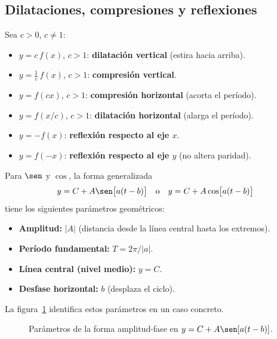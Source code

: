 \subsection{Dilataciones, compresiones y reflexiones}

Sea $c > 0$, $c \neq 1$:
\begin{itemize}
  \item $y = c\,f(x)$, $c>1$: \textbf{dilatación vertical} (estira hacia arriba).
  \item $y = \tfrac{1}{c}\,f(x)$, $c>1$: \textbf{compresión vertical}.
  \item $y = f(cx)$, $c>1$: \textbf{compresión horizontal} (acorta el período).
  \item $y = f(x/c)$, $c>1$: \textbf{dilatación horizontal} (alarga el período).
  \item $y = -f(x)$: \textbf{reflexión respecto al eje $x$}.
  \item $y = f(-x)$: \textbf{reflexión respecto al eje $y$} (no altera paridad).
\end{itemize}

Para $\sen$ y $\cos$, la forma generalizada
\[
  y = C + A\sen\bigl[a(t - b)\bigr] \quad \text{o} \quad y = C + A\cos\bigl[a(t - b)\bigr]
\]
tiene los siguientes parámetros geométricos:
\begin{itemize}
  \item \textbf{Amplitud:} $|A|$ (distancia desde la línea central hasta los extremos).
  \item \textbf{Período fundamental:} $T = 2\pi/|a|$.
  \item \textbf{Línea central (nivel medio):} $y = C$.
  \item \textbf{Desfase horizontal:} $b$ (desplaza el ciclo).
\end{itemize}

La figura~\ref{fig:amplitud_fase} identifica estos parámetros en un caso
concreto.

\begin{figure}[!htbp]
\centering
{}
\caption{Parámetros de la forma amplitud-fase en $y=C+A\sen[a(t-b)]$.}
\label{fig:amplitud_fase}
\end{figure}


